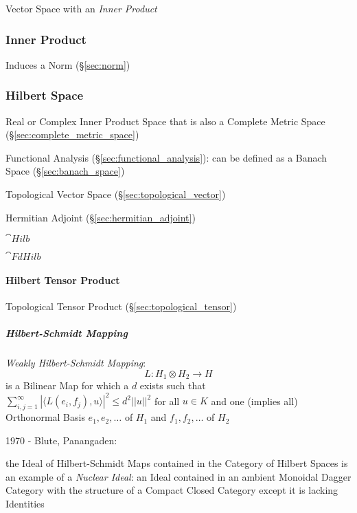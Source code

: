 Vector Space with an \emph{Inner Product}



\subsubsection{Inner Product}\label{sec:inner_product}

Induces a Norm (\S\ref{sec:norm})



\subsubsection{Hilbert Space}\label{sec:hilbert_space}

Real or Complex Inner Product Space that is also a Complete Metric
Space (\S\ref{sec:complete_metric_space})

Functional Analysis (\S\ref{sec:functional_analysis}): can be defined
as a Banach Space (\S\ref{sec:banach_space})

Topological Vector Space (\S\ref{sec:topological_vector})

Hermitian Adjoint (\S\ref{sec:hermitian_adjoint})

$\cat{Hilb}$

$\cat{FdHilb}$



\paragraph{Hilbert Tensor Product}\label{sec:hilbert_tensor}\hfill

Topological Tensor Product (\S\ref{sec:topological_tensor})



\subparagraph{Hilbert-Schmidt Mapping}\label{sec:hilbert_schmidt}\hfill

\emph{Weakly Hilbert-Schmidt Mapping}:
\[
  L : H_1 \otimes H_2 \rightarrow H
\]
is a Bilinear Map for which a $d$ exists such that
$\sum_{i,j=1}^\infty | \langle L(e_i,f_j), u \rangle |^2 \leq d^2
||u||^2$ for all $u \in K$ and one (implies all) Orthonormal Basis
$e_1, e_2, \ldots$ of $H_1$ and $f_1, f_2, \ldots$ of $H_2$


1970 - Blute, Panangaden:

the Ideal of Hilbert-Schmidt Maps contained in the Category of Hilbert
Spaces is an example of a \emph{Nuclear Ideal}: an Ideal contained in
an ambient Monoidal Dagger Category with the structure of a Compact
Closed Category except it is lacking Identities



